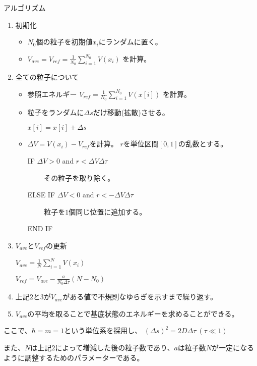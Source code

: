 \documentclass[dvipdfmx]{beamer}
\begin{document}
    \begin{frame}{アルゴリズム}
        \begin{enumerate}
            \item 初期化
            \begin{itemize}
                \item $N_0$個の粒子を初期値$x_i$にランダムに置く。
                \item $V_{ave} = V_{ref} = \frac{1}{N_0} \sum_{i=1}^{N_0}V(x_i)$ を計算。
            \end{itemize}
            \item 全ての粒子について
            \begin{itemize}
                \item 参照エネルギー
                $V_{ref} = \frac{1}{N_0}\sum_{i=1}^{N_0}V(x[i])$
                を計算。
                \item 粒子をランダムに$\Delta s$だけ移動(拡散)させる。

                $x[i] = x[i] \pm \Delta s$

                \item $\Delta V = V(x_i) - V_{ref}$を計算。
                $r$を単位区間$[0,1]$の乱数とする。

                IF $\Delta V > 0$ and $r < \Delta V \Delta \tau$

                ~~~~ その粒子を取り除く。

                ELSE IF $\Delta V < 0$ and $r < -\Delta V \Delta \tau$

                ~~~~ 粒子を$1$個同じ位置に追加する。

                END IF
            \end{itemize}

        \end{enumerate}
    \end{frame}

    \begin{frame}
        \begin{enumerate}
            \setcounter{enumi}{2}
            \item $V_{ave}$と$V_{ref}$の更新

            $V_{ave} = \frac{1}{N}\sum_{i=1}^{N}V(x_i)$

            $V_{ref} = V_{ave} - \frac{a}{N_0\Delta\tau}(N-N_0)$

            \item 上記$2$と$3$が$V_{ave}$がある値で不規則なゆらぎを示すまで繰り返す。

            \item $V_{ave}$の平均を取ることで基底状態のエネルギーを求めることができる。
        \end{enumerate}
        ここで、$\hbar = m = 1$という単位系を採用し、
        $(\Delta s)^2 = 2D\Delta \tau~(\tau \ll 1)$

        また、$N$は上記$2$によって増減した後の粒子数であり、$a$は粒子数$N$が一定になるように調整するためのパラメーターである。
    \end{frame}
\end{document}
